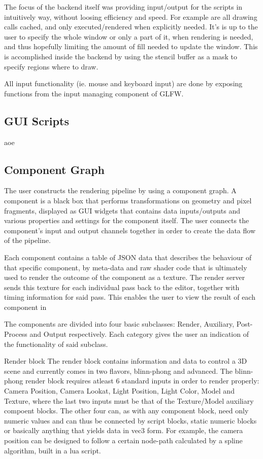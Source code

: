 The focus of the backend itself was providing input/output for the scripts in intuitively way, without loosing efficiency and speed. For example are all drawing calls cached, and only executed/rendered when explicitly needed. It's is up to the user to specify the whole window or only a part of it, when rendering is needed, and thus hopefully limiting the amount of fill needed to update the window. This is accomplished inside the backend by using the stencil buffer as a mask to specify regions where to draw.

All input functionality (ie. mouse and keyboard input) are done by exposing functions from the input managing component of GLFW.

\subsection{GUI Scripts}
aoe

\subsection{Component Graph}
The user constructs the rendering pipeline by using a component graph. A component is a black box that performs transformations on geometry and pixel fragments, displayed as GUI widgets that contains data inputs/outputs and various properties and settings for the component itself. The user connects the component’s input and output channels together in order to create the data flow of the pipeline. 

Each component contains a table of JSON data that describes the behaviour of that specific component, by meta-data and raw shader code that is ultimately used to render the outcome of the component as a texture. The render server sends this texture for each individual pass back to the editor, together with timing information for said pass. This enables the user to view the result of each component in 

The components are divided into four basic subclasses: Render, Auxiliary, Post-Process and Output respectively. Each category 
gives the user an indication of the functionality of said subclass. 

Render block
The render block contains information and data to control a 3D scene and currently comes in two flavors, blinn-phong and advanced. The blinn-phong render block requires atleast 6 standard inputs in order to render properly: Camera Position, Camera Lookat, Light Position, Light Color, Model and Texture, where the last two inputs must be that of the Texture/Model auxiliary compoent blocks. The other four can, as with any component block, need only numeric values and can thus be connected by script blocks, static numeric blocks or basically anything that yields data in vec3 form. For example, the camera position can be designed to follow a certain node-path calculated by a spline algorithm, built in a lua script. 


